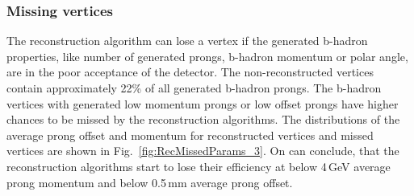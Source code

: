 \subsubsection{Missing vertices}
The reconstruction algorithm can lose a vertex if the generated b-hadron properties, like number of generated prongs, b-hadron momentum or polar angle, are in the poor acceptance of the detector. 
The non-reconstructed vertices contain approximately 22\% of all generated b-hadron prongs. 
The b-hadron vertices with generated low momentum prongs or low offset prongs have higher chances to be missed by the reconstruction algorithms. 
The distributions of the average prong offset and momentum for reconstructed vertices and missed vertices are shown in Fig.~\ref{fig:RecMissedParams_3}. 
On can conclude, that the reconstruction algorithms start to lose their efficiency at below 4\,GeV average prong momentum and below 0.5\,mm average prong offset. 

